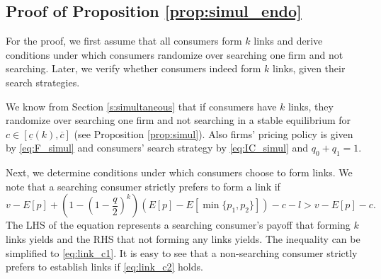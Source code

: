 \documentclass[12pt]{article}
\begin{document}
\subsection{Proof of Proposition \ref{prop:simul_endo}}

For the proof, we first assume that all consumers form $k$ links and derive 
conditions under which consumers randomize over searching one firm and not 
searching. Later, we verify whether consumers indeed form $k$ links, given 
their search strategies.

We know from Section \ref{s:simultaneous} that if consumers have $k$ links, 
they randomize over searching one firm and not searching in a stable 
equilibrium for $c \in [\underline{c}(k),\overline{c}]$ (see Proposition 
\ref{prop:simul}).  Also firms' pricing policy is given by \eqref{eq:F_simul} 
and consumers' search strategy by \eqref{eq:IC_simul} and $q_0+q_1=1.$

Next, we determine conditions under which consumers choose to form links.  
We note that a searching consumer strictly prefers to form a link if
\begin{equation*}
v - E[p] + \left(1 - \left(1 - 
\frac{q}{2}\right)^k\right)(E[p]-E[\min\{p_1,p_2\}]) - c-l>v-E[p]-c.
\end{equation*}
The LHS of the equation represents a searching consumer's payoff that forming 
$k$ links yields and the RHS that not forming any links yields.  The inequality 
can be simplified to \eqref{eq:link_c1}. It is easy to see that a non-searching 
consumer strictly prefers to establish links if \eqref{eq:link_c2} holds.
\end{document}
